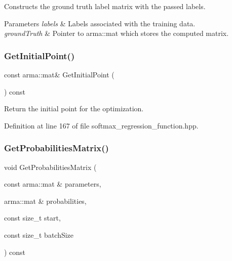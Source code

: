 Constructs the ground truth label matrix with the passed labels. 


\begin{DoxyParams}{Parameters}
{\em labels} & Labels associated with the training data. \\
\hline
{\em ground\+Truth} & Pointer to arma\+::mat which stores the computed matrix. \\
\hline
\end{DoxyParams}
\mbox{\label{classmlpack_1_1regression_1_1SoftmaxRegressionFunction_ac3e9aa612cb56d0d93f3259f4a8122bb}} 
\subsubsection{Get\+Initial\+Point()}
{\footnotesize\ttfamily const arma\+::mat\& Get\+Initial\+Point (\begin{DoxyParamCaption}{ }\end{DoxyParamCaption}) const\hspace{0.3cm}{\ttfamily [inline]}}



Return the initial point for the optimization. 



Definition at line 167 of file softmax\+\_\+regression\+\_\+function.\+hpp.

\mbox{\label{classmlpack_1_1regression_1_1SoftmaxRegressionFunction_ab7a1e4a3f61c8476cb508491173e97ea}} 
\subsubsection{Get\+Probabilities\+Matrix()}
{\footnotesize\ttfamily void Get\+Probabilities\+Matrix (\begin{DoxyParamCaption}\item[{const arma\+::mat \&}]{parameters,  }\item[{arma\+::mat \&}]{probabilities,  }\item[{const size\+\_\+t}]{start,  }\item[{const size\+\_\+t}]{batch\+Size }\end{DoxyParamCaption}) const}



